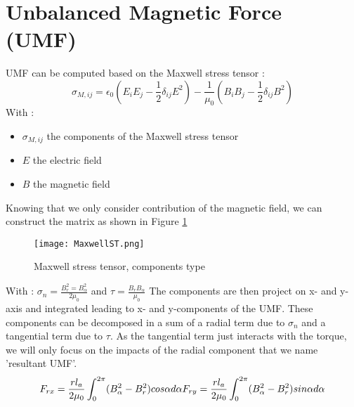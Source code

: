 \section{Unbalanced Magnetic Force (UMF)}
UMF can be computed based on the Maxwell stress tensor : 
\begin{equation}
    \sigma_{M,ij} = 
    \epsilon_0 \left( E_i E_j - \frac{1}{2}\delta_{ij}E^2\right)
    -\frac{1}{\mu_0}\left( B_i B_j -\frac{1}{2}\delta_{ij}B^2\right)
\end{equation}
With : 
\begin{itemize}
    \item $\sigma_{M,ij}$ the components of the Maxwell stress tensor
    \item $E$ the electric field 
    \item $B$ the magnetic field
\end{itemize}

Knowing that we only consider contribution of the magnetic field, we can construct the matrix as shown in Figure \ref{fig:maxwellst}
\begin{figure}[H]
    \centering
    \texttt{[image: MaxwellST.png]}
    \caption{Maxwell stress tensor, components type}
    \label{fig:maxwellst}
\end{figure}
With : $\sigma_n = \frac{B_r^2 = B_\alpha^2}{2\mu_0}$ and $\tau= \frac{B_rB_\alpha}{\mu_0}$
The components are then project on x- and y-axis and integrated leading to x- and y-components of the UMF. These components can be decomposed in a sum of a radial term due to $\sigma_n$ and a tangential term due to $\tau$. As the tangential term just interacts with the torque, we will only focus on the impacts of the radial component that we name 'resultant UMF'. 
\begin{equation}
    F_{rx} = \frac{rl_a}{2\mu_0} \int_0^{2\pi} (B_\alpha^2 - B_r^2) cos \alpha d\alpha\\
    F_{ry} = \frac{rl_a}{2\mu_0} \int_0^{2\pi} (B_\alpha^2 - B_r^2) sin \alpha d\alpha
\end{equation}

